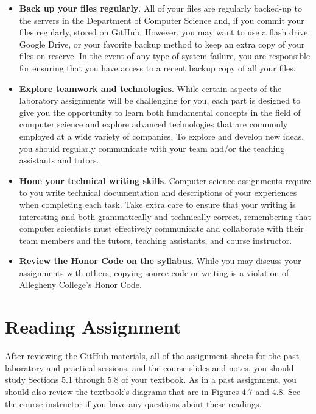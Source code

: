 \documentclass[11pt]{article}
\begin{document}
\begin{itemize}
\item {\bf Back up your files regularly}. All of your files are regularly backed-up to the servers in the Department of
  Computer Science and, if you commit your files regularly, stored on GitHub. However, you may want to use a flash
  drive, Google Drive, or your favorite backup method to keep an extra copy of your files on reserve. In the event of
  any type of system failure, you are responsible for ensuring that you have access to a recent backup copy of all your
  files.

\item {\bf Explore teamwork and technologies}. While certain aspects of the laboratory assignments will be challenging
  for you, each part is designed to give you the opportunity to learn both fundamental concepts in the field of computer
  science and explore advanced technologies that are commonly employed at a wide variety of companies. To explore and
  develop new ideas, you should regularly communicate with your team and/or the teaching assistants and tutors.

\item {\bf Hone your technical writing skills}. Computer science assignments require to you write technical
  documentation and descriptions of your experiences when completing each task. Take extra care to ensure that your
  writing is interesting and both grammatically and technically correct, remembering that computer scientists must
  effectively communicate and collaborate with their team members and the tutors, teaching assistants, and course
  instructor.

\item {\bf Review the Honor Code on the syllabus}. While you may discuss your assignments with others, copying source
  code or writing is a violation of Allegheny College's Honor Code.

\end{itemize}

\section*{Reading Assignment}

After reviewing the GitHub materials, all of the assignment sheets for the past laboratory and practical sessions, and
the course slides and notes, you should study Sections 5.1 through 5.8 of your textbook. As in a past assignment, you
should also review the textbook's diagrams that are in Figures 4.7 and 4.8. See the course instructor if you have any
questions about these readings.
\end{document}
